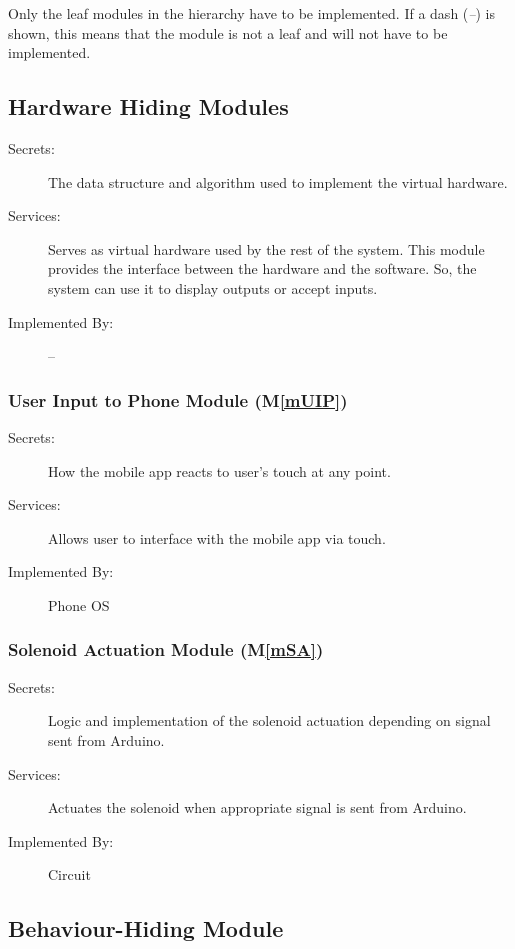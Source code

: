 \documentclass[12pt, titlepage]{article}
\newcommand{\mref}[1]{M\ref{#1}}
\begin{document}
Only the leaf modules in the hierarchy have to be implemented. If a dash
(\emph{--}) is shown, this means that the module is not a leaf and will not have
to be implemented.

\subsection{Hardware Hiding Modules}

\begin{description}
\item[Secrets:]The data structure and algorithm used to implement the virtual
  hardware.
\item[Services:]Serves as virtual hardware used by the rest of the system. This module provides the interface between the hardware and the software. So, the system can use it to display outputs or accept inputs.
\item[Implemented By:]--
\end{description}

\subsubsection{User Input to Phone Module  (\mref{mUIP})}
\begin{description}
\item[Secrets:]How the mobile app reacts to user’s touch at any point.
\item[Services:]Allows user to interface with the mobile app via touch.
\item[Implemented By:] Phone OS
\end{description}

\subsubsection{Solenoid Actuation Module  (\mref{mSA})}
\begin{description}
\item[Secrets:]Logic and implementation of the solenoid actuation depending on signal sent from Arduino.
\item[Services:]Actuates the solenoid when appropriate signal is sent from Arduino.
\item[Implemented By:] Circuit
\end{description}

\subsection{Behaviour-Hiding Module}
\end{document}
